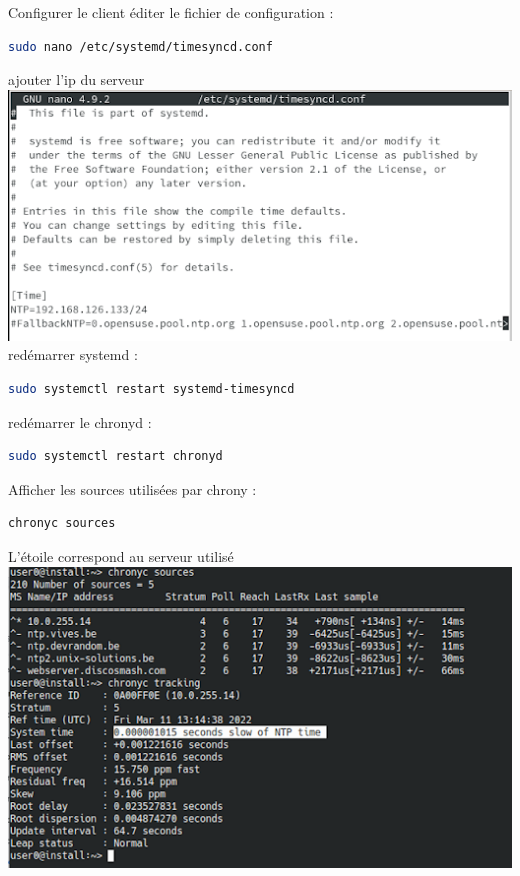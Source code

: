 \documentclass[a4paper]{article}
\begin{document}
\begin{adjustwidth}{-2cm}{-2cm}
Configurer le client
\noindent éditer le fichier de configuration :
\begin{lstlisting}[language=bash]
sudo nano /etc/systemd/timesyncd.conf
\end{lstlisting}
ajouter l'ip du serveur \newline \newline
\includegraphics[scale=0.8]{picture/8.png} 
\newpage
\noindent redémarrer systemd :
\begin{lstlisting}[language=bash]
sudo systemctl restart systemd-timesyncd
\end{lstlisting}

\noindent redémarrer le chronyd :
\begin{lstlisting}[language=bash]
sudo systemctl restart chronyd
\end{lstlisting}

\noindent Afficher les sources utilisées par chrony :
\begin{lstlisting}[language=bash]
 chronyc sources
\end{lstlisting}
L'étoile correspond au serveur utilisé \newline \newline
\includegraphics[scale=0.8]{picture/9.png} 


\end{adjustwidth}
\end{document}
